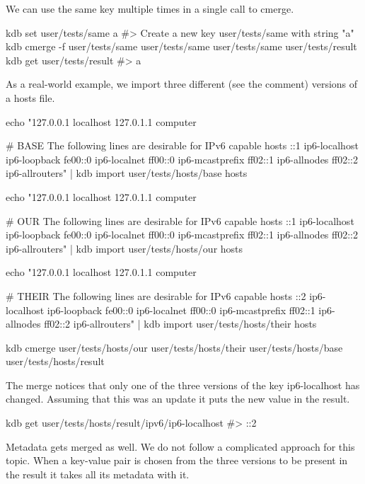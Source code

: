 We can use the same key multiple times in a single call to cmerge.


\begin{DoxyCode}
kdb set user/tests/same a
#> Create a new key user/tests/same with string "a"
kdb cmerge -f user/tests/same user/tests/same user/tests/same user/tests/result
kdb get user/tests/result
#> a
\end{DoxyCode}


As a real-\/world example, we import three different (see the comment) versions of a hosts file.


\begin{DoxyCode}
echo "127.0.0.1       localhost
127.0.1.1       computer

# BASE The following lines are desirable for IPv6 capable hosts
::1     ip6-localhost ip6-loopback
fe00::0 ip6-localnet
ff00::0 ip6-mcastprefix
ff02::1 ip6-allnodes
ff02::2 ip6-allrouters" | kdb import user/tests/hosts/base hosts

echo "127.0.0.1       localhost
127.0.1.1       computer

# OUR The following lines are desirable for IPv6 capable hosts
::1     ip6-localhost ip6-loopback
fe00::0 ip6-localnet
ff00::0 ip6-mcastprefix
ff02::1 ip6-allnodes
ff02::2 ip6-allrouters" | kdb import user/tests/hosts/our hosts

echo "127.0.0.1       localhost
127.0.1.1       computer

# THEIR The following lines are desirable for IPv6 capable hosts
::2     ip6-localhost ip6-loopback
fe00::0 ip6-localnet
ff00::0 ip6-mcastprefix
ff02::1 ip6-allnodes
ff02::2 ip6-allrouters" | kdb import user/tests/hosts/their hosts

kdb cmerge user/tests/hosts/our user/tests/hosts/their user/tests/hosts/base user/tests/hosts/result
\end{DoxyCode}


The merge notices that only one of the three versions of the key {\ttfamily ip6-\/localhost} has changed. Assuming that this was an update it puts the new value in the result.


\begin{DoxyCode}
kdb get user/tests/hosts/result/ipv6/ip6-localhost
#> ::2
\end{DoxyCode}


Metadata gets merged as well. We do not follow a complicated approach for this topic. When a key-\/value pair is chosen from the three versions to be present in the result it takes all its metadata with it.

